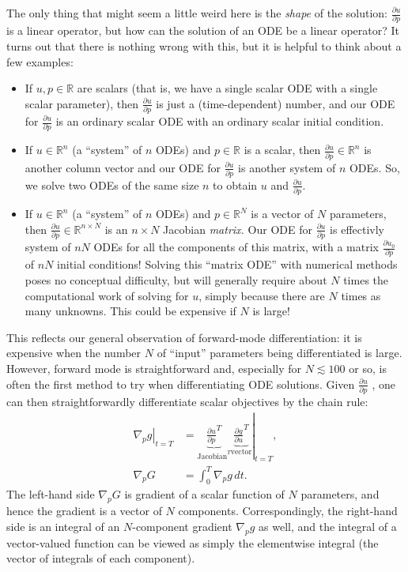 The only thing that might seem a little weird here is the \emph{shape}
of the solution: $\frac{\partial u}{\partial p}$ is a linear operator,
but how can the solution of an ODE be a linear operator? It turns
out that there is nothing wrong with this, but it is helpful to think
about a few examples:
\begin{itemize}
\item If $u,p\in\mathbb{R}$ are scalars (that is, we have a single scalar
ODE with a single scalar parameter), then $\frac{\partial u}{\partial p}$
is just a (time-dependent) number, and our ODE for $\frac{\partial u}{\partial p}$
is an ordinary scalar ODE with an ordinary scalar initial condition.
\item If $u\in\mathbb{R}^{n}$ (a ``system'' of $n$ ODEs) and $p\in\mathbb{R}$
is a scalar, then $\frac{\partial u}{\partial p}\in\mathbb{R}^{n}$
is another column vector and our ODE for $\frac{\partial u}{\partial p}$
is another system of $n$ ODEs. So, we solve two ODEs of the same
size $n$ to obtain $u$ and $\frac{\partial u}{\partial p}$.
\item If $u\in\mathbb{R}^{n}$ (a ``system'' of $n$ ODEs) and $p\in\mathbb{R}^{N}$
is a vector of $N$ parameters, then $\frac{\partial u}{\partial p}\in\mathbb{R}^{n\times N}$
is an $n\times N$ Jacobian \emph{matrix. }Our ODE for $\frac{\partial u}{\partial p}$
is effectivly system of $nN$ ODEs for all the components of this matrix,
with a matrix $\frac{\partial u_{0}}{\partial p}$ of $nN$ initial
conditions! Solving this ``matrix ODE'' with numerical methods poses
no conceptual difficulty, but will generally require about $N$ times
the computational work of solving for $u$, simply because there are
$N$ times as many unknowns. This could be expensive if $N$ is large!
\end{itemize}
This reflects our general observation of forward-mode differentiation:
it is expensive when the number $N$ of ``input'' parameters being
differentiated is large. However, forward mode is straightforward
and, especially for $N\lesssim100$ or so, is often the first method
to try when differentiating ODE solutions. Given $\frac{\partial u}{\partial p}$
, one can then straightforwardly differentiate scalar objectives by
the chain rule: 
\begin{align*}
\left.\nabla_{p}g\right|_{t=T} & =\left.\underbrace{\frac{\partial u}{\partial p}^{T}}_{\text{Jacobian}^{T}}\underbrace{\frac{\partial g}{\partial u}^{T}}_{\text{vector}}\right|_{t=T},\\
\nabla_{p}G & =\int_{0}^{T}\nabla_{p}g\,dt.
\end{align*}
The left-hand side $\nabla_p G$ is gradient of a scalar function of $N$ parameters, and hence the gradient is a vector of $N$ components.  Correspondingly, the right-hand side is an integral of an $N$-component gradient $\nabla_p g$ as well, and the integral of a vector-valued function can be viewed as simply the elementwise integral (the vector of integrals of each component).

